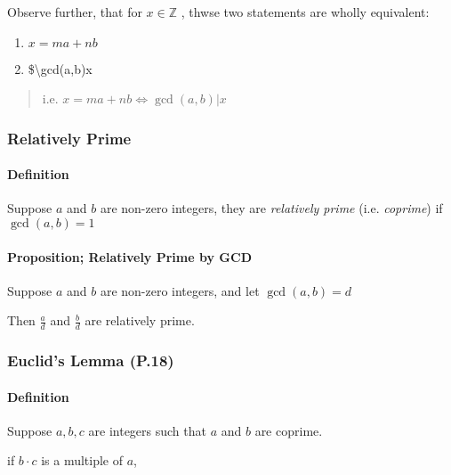 \documentclass[
]{article}
\begin{document}
Observe further, that for \(x \in \mathbb{Z}\) , thwse two statements
are wholly equivalent:

\begin{enumerate}
\def\labelenumi{\arabic{enumi}.}
\item
  \(x = ma+nb\)
\item
  \$\textbackslash gcd(a,b)\textbar x
\end{enumerate}

\begin{quote}
i.e. \(x = ma + nb \iff \gcd(a,b) | x\)
\end{quote}

\hypertarget{header-n133}{%
\subsubsection{Relatively Prime}\label{header-n133}}

\hypertarget{header-n134}{%
\paragraph{Definition}\label{header-n134}}

Suppose \(a\) and \(b\) are non-zero integers, they are \emph{relatively
prime} (i.e. \emph{coprime}) if \(\gcd(a,b)=1\)

\hypertarget{header-n136}{%
\paragraph{Proposition; Relatively Prime by GCD}\label{header-n136}}

Suppose \(a\) and \(b\) are non-zero integers, and let \(\gcd(a,b) =d\)

Then \(\frac{a}{d}\) and \(\frac{b}{d}\) are relatively prime.

\hypertarget{header-n139}{%
\subsubsection{Euclid's Lemma (P.18)}\label{header-n139}}

\hypertarget{header-n140}{%
\paragraph{Definition}\label{header-n140}}

Suppose \(a, b, c\) are integers such that \(a\) and \(b\) are coprime.

if \(b\cdot c\) is a multiple of \(a\),
\end{document}
